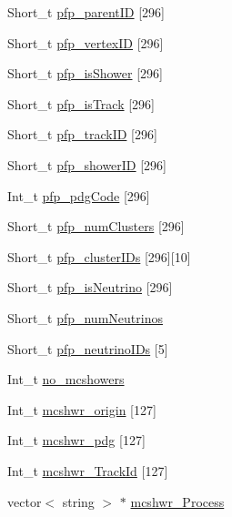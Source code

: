 \begin{DoxyCompactItemize}
\item 
Short\-\_\-t \hyperlink{classanatree_a82369d03724e7da696a68626502d6782}{pfp\-\_\-parent\-I\-D} \mbox{[}296\mbox{]}
\item 
Short\-\_\-t \hyperlink{classanatree_ae3a9bbe646962a0a28780e6e9dca0085}{pfp\-\_\-vertex\-I\-D} \mbox{[}296\mbox{]}
\item 
Short\-\_\-t \hyperlink{classanatree_a3fe78d565655712bbb5437d5601160cb}{pfp\-\_\-is\-Shower} \mbox{[}296\mbox{]}
\item 
Short\-\_\-t \hyperlink{classanatree_a47bac3589758f77cd3591cd6588a8010}{pfp\-\_\-is\-Track} \mbox{[}296\mbox{]}
\item 
Short\-\_\-t \hyperlink{classanatree_a5a4637c9c31f44ec1d8c18d4ce350864}{pfp\-\_\-track\-I\-D} \mbox{[}296\mbox{]}
\item 
Short\-\_\-t \hyperlink{classanatree_a471943b903336e553bcb6a83f31f9668}{pfp\-\_\-shower\-I\-D} \mbox{[}296\mbox{]}
\item 
Int\-\_\-t \hyperlink{classanatree_ab0c43586bd5a124a61be3ed714be8664}{pfp\-\_\-pdg\-Code} \mbox{[}296\mbox{]}
\item 
Short\-\_\-t \hyperlink{classanatree_ab01b84efca905a989fcbd71deb9d6d35}{pfp\-\_\-num\-Clusters} \mbox{[}296\mbox{]}
\item 
Short\-\_\-t \hyperlink{classanatree_a206497eb6dfade4a542d3cd62d9e33eb}{pfp\-\_\-cluster\-I\-Ds} \mbox{[}296\mbox{]}\mbox{[}10\mbox{]}
\item 
Short\-\_\-t \hyperlink{classanatree_a659a9f748475ebbddd195c3e7d662fd3}{pfp\-\_\-is\-Neutrino} \mbox{[}296\mbox{]}
\item 
Short\-\_\-t \hyperlink{classanatree_aa8d83ba725f4d317a1b81a1c6d8e270f}{pfp\-\_\-num\-Neutrinos}
\item 
Short\-\_\-t \hyperlink{classanatree_acdbc1868566b30e6fc35afd5d9f250b5}{pfp\-\_\-neutrino\-I\-Ds} \mbox{[}5\mbox{]}
\item 
Int\-\_\-t \hyperlink{classanatree_ae77617a039a9df423a3e1ac0c13856df}{no\-\_\-mcshowers}
\item 
Int\-\_\-t \hyperlink{classanatree_aaf456963e3e229b8219a010a539ec71b}{mcshwr\-\_\-origin} \mbox{[}127\mbox{]}
\item 
Int\-\_\-t \hyperlink{classanatree_a8bb98dfea033c8b3977b04849c3ce03c}{mcshwr\-\_\-pdg} \mbox{[}127\mbox{]}
\item 
Int\-\_\-t \hyperlink{classanatree_ac06ac54bed76c8f15659ce042673db42}{mcshwr\-\_\-\-Track\-Id} \mbox{[}127\mbox{]}
\item 
vector$<$ string $>$ $\ast$ \hyperlink{classanatree_a231d8275738c1e88e811d38922ada74b}{mcshwr\-\_\-\-Process}

\end{DoxyCompactItemize}
